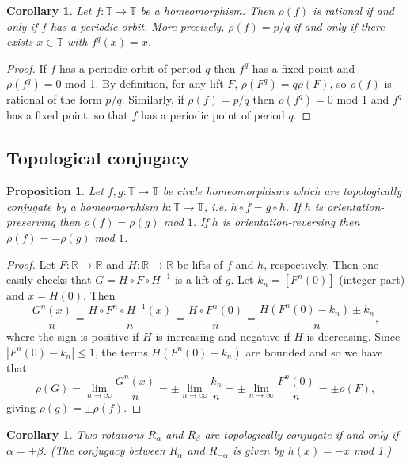 \documentclass[12pt]{article}
\newtheorem{corollary}[theorem]{Corollary}
\newtheorem{proposition}[theorem]{Proposition}
\theoremstyle{definition}
\theoremstyle{remark}
\begin{document}
\begin{corollary}
Let $f : \mathbb T \to \mathbb T$ be a homeomorphism. Then $\rho(f)$ is rational if and only if $f$ has a periodic orbit.
More precisely, $\rho(f) = p/q$ if and only if there exists $x \in \mathbb T$ with $f^q(x)=x$.
\end{corollary}

\begin{proof}
If $f$ has a periodic orbit of period $q$ then $f^q$ has a fixed point and $\rho(f^q)=0$ mod 1. 
By definition, for any lift $F$, $\rho(F^q)=q\rho(F)$, so $\rho(f)$ is rational of the form $p/q$.
Similarly, if $\rho(f)=p/q$ then $\rho(f^q) =0$ mod 1 and $f^q$ has a fixed point, so that $f$ has a
periodic point of period $q$.
\end{proof}


\subsection{Topological conjugacy}

\begin{proposition}
Let $f,g :\mathbb T \to \mathbb T$ be circle homeomorphisms which are topologically conjugate by a homeomorphism
$h : \mathbb T \to \mathbb T$,
i.e. $h \circ f = g \circ h$. If $h$ is orientation-preserving then $\rho(f)=\rho(g)$ mod $1$. If $h$ is orientation-reversing then $\rho(f) =-\rho(g)$ mod $1$.
\end{proposition}

\begin{proof}
Let $F : \mathbb R \to \mathbb R$ and $H : \mathbb R \to \mathbb R$ be lifts of $f$ and $h$, respectively.
Then one easily checks that $G = H \circ F \circ H^{-1}$ is a lift of $g$. Let
$k_n =[F^n(0)]$ (integer part) and $x = H(0)$. Then
\[
\frac{G^n(x)}{n}  = \frac{H \circ F^n \circ H^{-1}(x)}{n}
= \frac{H \circ F^n(0)}{n} =
\frac{H(F^n(0) -k_n) \pm k_n}{n},
\]
where the sign is positive if $H$ is increasing and negative if $H$ is decreasing.
Since $|F^n(0)-k_n| \le 1$, the terms $H(F^n(0) -k_n)$ are bounded and so we have that
\[
\rho(G) = \lim_{n \to \infty} \frac{G^n(x)}{n} 
= \pm \lim_{n \to \infty} \frac{k_n}{n} 
= \pm \lim_{n \to \infty}\frac{F^n(0)}{n}
= \pm \rho(F),
\]
giving $\rho(g) = \pm \rho(f)$.
\end{proof}

\begin{corollary}
Two rotations $R_\alpha$ and $R_\beta$ are topologically conjugate if and only if $\alpha = \pm \beta$.
(The conjugacy between $R_\alpha$ and $R_{-\alpha}$ is given by $h(x) =-x$ mod 1.)
\end{corollary}
\end{document}
